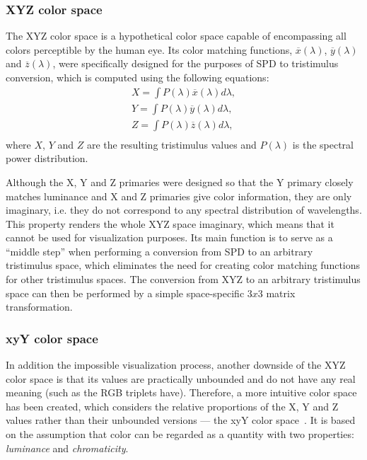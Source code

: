 \subsubsection{XYZ color space}

The XYZ color space is a hypothetical color space capable of encompassing all colors perceptible by the human eye. Its color matching functions, $\overline{x}(\lambda)$, $\overline{y}(\lambda)$ and $\overline{z}(\lambda)$, were specifically designed for the purposes of SPD to tristimulus conversion, which is computed using the following equations:
\begin{equation} \label{spdToXYZ}
	\begin{aligned}
	X=\int P(\lambda)\overline{x}(\lambda)d\lambda,\\
	Y=\int P(\lambda)\overline{y}(\lambda)d\lambda,\\
	Z=\int P(\lambda)\overline{z}(\lambda)d\lambda,\\
	\end{aligned}
\end{equation}
where $X$, $Y$ and $Z$ are the resulting tristimulus values and $P(\lambda)$ is the spectral power distribution.

Although the X, Y and Z primaries were designed so that the Y primary closely matches luminance and X and Z primaries give color information, they are only imaginary, i.e. they do not correspond to any spectral distribution of wavelengths. This property renders the whole XYZ space imaginary, which means that it cannot be used for visualization purposes. Its main function is to serve as a ``middle step'' when performing a conversion from SPD to an arbitrary tristimulus space, which eliminates the need for creating color matching functions for other tristimulus spaces. The conversion from XYZ to an arbitrary tristimulus space can then be performed by a simple space-specific $3x3$ matrix transformation.

\subsubsection{xyY color space} \label{sssect:xyYcolorSpace}

In addition the impossible visualization process, another downside of the XYZ color space is that its values are practically unbounded and do not have any real meaning (such as the RGB triplets have). Therefore, a more intuitive color space has been created, which considers the relative proportions of the X, Y and Z values rather than their unbounded versions --- the xyY color space~\cite{xyYOverview}. It is based on the assumption that color can be regarded as a quantity with two properties: \emph{luminance} and \emph{chromaticity}.

